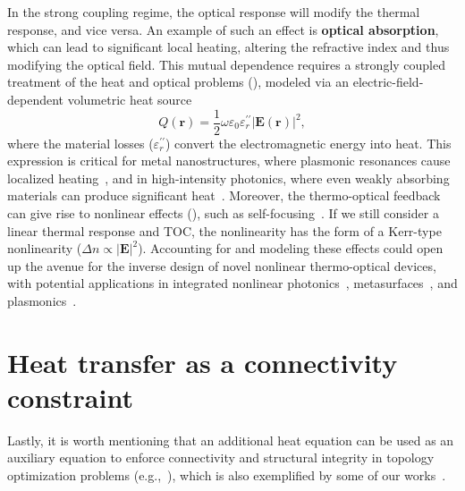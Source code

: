 In the strong coupling regime, the optical response will modify the thermal response, and vice versa.
An example of such an effect is \textbf{optical absorption}, which can lead to significant local heating, altering the refractive index and thus modifying the optical field. 
This mutual dependence requires a strongly coupled treatment of the heat and optical problems (), modeled via an electric-field-dependent volumetric heat source~\cite{plasm_heat_source}
\[
Q(\mathbf{r}) = \frac{1}{2} \omega \varepsilon_0 \varepsilon_r^{\prime \prime} |\mathbf{E}(\mathbf{r})|^2,
\]
where the material losses ($\varepsilon_r^{\prime \prime}$) convert the electromagnetic energy into heat. 
This expression is critical for metal nanostructures, where plasmonic resonances cause localized heating~\cite{plasm_heat_source}, and in high-intensity photonics, where even weakly absorbing materials can produce significant heat~\cite{thermal_nl, high_I_T}. Moreover, the thermo-optical feedback can give rise to nonlinear effects (), such as self-focusing~\cite{thermal_nl}. If we still consider a linear
thermal response and TOC,
the nonlinearity has the form of a Kerr-type nonlinearity ($\Delta n \propto \vert \mathbf{E} \vert^2$). Accounting for and modeling
these effects could open up the avenue for the inverse design of novel nonlinear thermo-optical devices, with potential applications
in integrated nonlinear photonics~\cite{nl_photonics}, metasurfaces~\cite{nl_meta}, and plasmonics~\cite{novotny}.

\section{Heat transfer as a connectivity constraint}\label{sec:aux}

Lastly, it is worth mentioning that an additional heat equation can be used as an auxiliary equation to enforce connectivity
and structural integrity in topology optimization problems (e.g.,~\cite{vanessa, structural_heat}), which is also exemplified by some of our
works~\cite{ownpub1,ownpub2}. 

